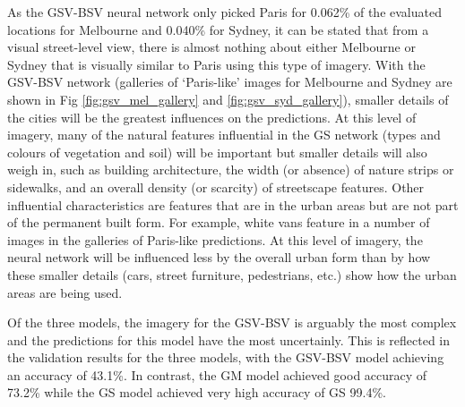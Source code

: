 \documentclass[10pt,letterpaper,hidelinks]{article}
\begin{document}
%
%
%

As the GSV-BSV neural network only picked Paris for 0.062\% of the evaluated locations for Melbourne and 0.040\% for Sydney, it can be stated that from a visual street-level view, there is almost nothing about either Melbourne or Sydney that is visually similar to Paris using this type of imagery. With the GSV-BSV network (galleries of `Paris-like' images for Melbourne and Sydney are shown in Fig \ref{fig:gsv_mel_gallery} and  \ref{fig:gsv_syd_gallery}), smaller details of the cities will be the greatest influences on the predictions. At this level of imagery, many of the natural features influential in the GS network (types and colours of vegetation and soil) will be important but smaller details will also weigh in, such as building architecture, the width (or absence) of nature strips or sidewalks, and an overall density (or scarcity) of streetscape features. Other influential characteristics are features that are in the urban areas but are not part of the permanent built form. For example, white vans feature in a number of images in the galleries of Paris-like predictions. At this level of imagery, the neural network will be influenced less by the overall urban form than by how these smaller details (cars, street furniture, pedestrians, etc.) show how the urban areas are being used.

Of the three models, the imagery for the GSV-BSV is arguably the most complex and the predictions for this model have the most uncertainly. This is reflected in the validation results for the three models, with the GSV-BSV model achieving an accuracy of 43.1\%. In contrast, the GM model achieved good accuracy of 73.2\% while the GS model achieved very high accuracy of GS 99.4\%.



%
\end{document}
